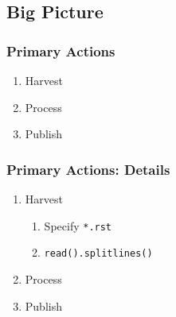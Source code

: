 \subsection{Big Picture}
\begin{frame}
	\frametitle{Primary Actions}
	\begin{enumerate}
		\item Harvest  
		\item Process  
		\item Publish  
	\end{enumerate}
\end{frame}

\begin{frame}
	\frametitle{Primary Actions: Details}
	\begin{enumerate}
		\item Harvest  
		\begin{enumerate}
			\item Specify \texttt{*.rst}
			\item \texttt{read().splitlines()}
		\end{enumerate}
		\item Process  
		\item Publish  
	\end{enumerate}
\end{frame}

\endinput  %




%


